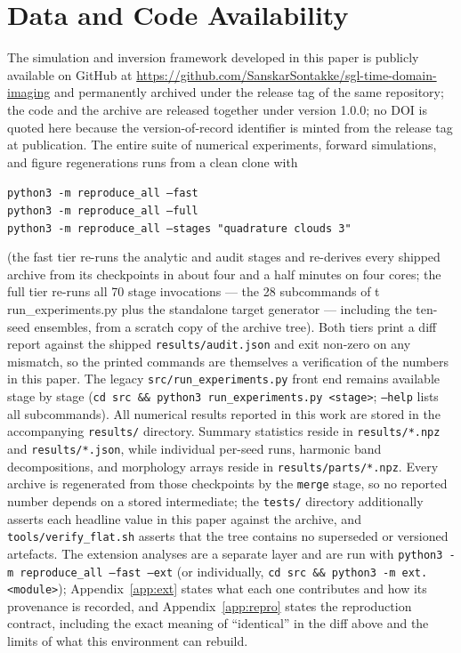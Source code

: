 \documentclass[twocolumn,10pt]{article}
\begin{document}
\section*{Data and Code Availability}
The simulation and inversion framework developed in this paper is publicly available
on GitHub at \url{https://github.com/SanskarSontakke/sgl-time-domain-imaging} and permanently
archived under the release tag of the same repository; the code and the
archive are released together under version 1.0.0; no DOI is quoted here because the
version-of-record identifier is minted from the release tag at publication.
The entire suite of numerical experiments, forward simulations, and figure regenerations runs from a
clean clone with
\begin{center}
{\tt python3 -m reproduce\_all --fast}\\
{\tt python3 -m reproduce\_all --full}\\
{\tt python3 -m reproduce\_all --stages "quadrature clouds 3"}
\end{center}
(the fast tier re-runs the analytic and audit stages and re-derives every shipped archive from its
checkpoints in about four and a half minutes on four cores; the full tier re-runs all 70 stage
invocations --- the 28 subcommands of {	t run\_experiments.py} plus the standalone target
generator --- including the ten-seed ensembles, from a scratch copy of the archive tree). Both tiers
print a
diff report against the shipped {\tt results/audit.json} and exit non-zero on any mismatch, so the
printed commands are themselves a verification of the numbers in this paper. The legacy
{\tt src/run\_experiments.py} front end remains available stage by stage
({\tt cd src \&\& python3 run\_experiments.py <stage>}; {\tt --help} lists all subcommands).
All numerical results reported in this work are stored in the accompanying {\tt results/} directory.
Summary statistics reside in {\tt results/*.npz} and {\tt results/*.json}, while individual per-seed runs,
harmonic band decompositions, and morphology arrays reside in {\tt results/parts/*.npz}. Every archive
is regenerated from those checkpoints by the {\tt merge} stage, so no reported number depends on a
stored intermediate; the {\tt tests/} directory additionally asserts each headline value in this
paper against the archive, and {\tt tools/verify\_flat.sh} asserts that the tree contains no
superseded or versioned artefacts. The extension analyses are a separate layer and are run
with {\tt python3 -m reproduce\_all --fast --ext} (or individually, {\tt cd src \&\& python3 -m
ext.<module>}); Appendix~\ref{app:ext} states what each one contributes and how its provenance is
recorded, and Appendix~\ref{app:repro} states the reproduction contract, including the exact meaning
of ``identical'' in the diff above and the limits of what this environment can rebuild.
\end{document}
